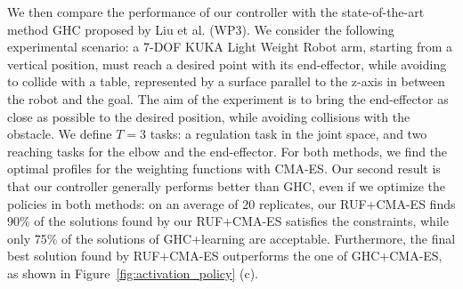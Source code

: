 We then compare the performance of our controller with the state-of-the-art
method GHC proposed by Liu et al. \cite{liu_ICRA2015} (WP3). We consider the
following experimental scenario: a 7-DOF KUKA Light Weight Robot arm, starting
from a vertical position, must reach a desired point with its end-effector,
while avoiding to collide with a table, represented by a surface parallel to the
z-axis in between the robot and the goal. The aim of the experiment is to bring
the end-effector as close as possible to the desired position, while avoiding
collisions with the obstacle. We define  $T=3$ tasks: a regulation task in the
joint space, and two reaching tasks for the elbow and the end-effector. For both
methods, we find the optimal profiles for the weighting functions with CMA-ES.
Our second result is that our controller generally performs better than GHC,
even if we optimize the policies in both methods: on an average of 20
replicates, our RUF+CMA-ES finds 90\% of the solutions found by our RUF+CMA-ES
satisfies the constraints, while only 75\% of the solutions of GHC+learning are
acceptable. Furthermore, the final best solution found by RUF+CMA-ES outperforms
the one of GHC+CMA-ES, as shown in Figure~\ref{fig:activation_policy} (c).

